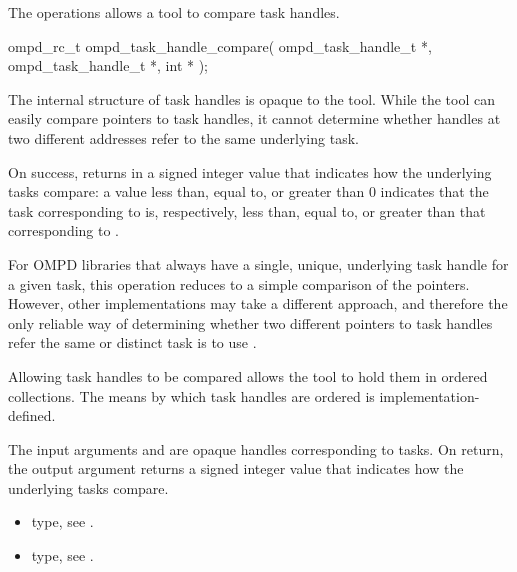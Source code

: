 \begin{itemize}
\label{subsubsubsec:ompd_task_handle_compare}
\summary
The  operations allows a tool to compare task
handles.

\format

\begin{cspecific}
\begin{ompSyntax}
ompd_rc_t ompd_task_handle_compare(
  ompd_task_handle_t *,
  ompd_task_handle_t *,
  int *
);
\end{ompSyntax}
\end{cspecific}


\descr
The internal structure of task handles is opaque to the tool. While the tool can easily compare
pointers to task handles, it cannot determine whether handles at two different addresses refer
to the same underlying task.

On success,  returns in  a signed integer
value that indicates how the underlying tasks compare: a value less than, equal to, or greater than
0 indicates that the task corresponding to  is, respectively, less than, equal
to, or greater than that corresponding to .

For OMPD libraries that always have a single, unique, underlying task handle for a given
task, this operation reduces to a simple comparison of the pointers. However, other
implementations may take a different approach, and therefore the only reliable way of determining
whether two different pointers to task handles refer the same or distinct task is to use
.

Allowing task handles to be compared allows the tool to hold them in ordered collections.
The means by which task handles are ordered is implementation-defined.

\argdesc
The input arguments  and  are opaque handles
corresponding to tasks.
On return, the output argument   returns a signed
integer value that indicates how the underlying tasks compare.

\crossreferences
\begin{itemize}
	\item {} type, see .
	\item {} type, see .
\end{itemize}




\end{itemize}
